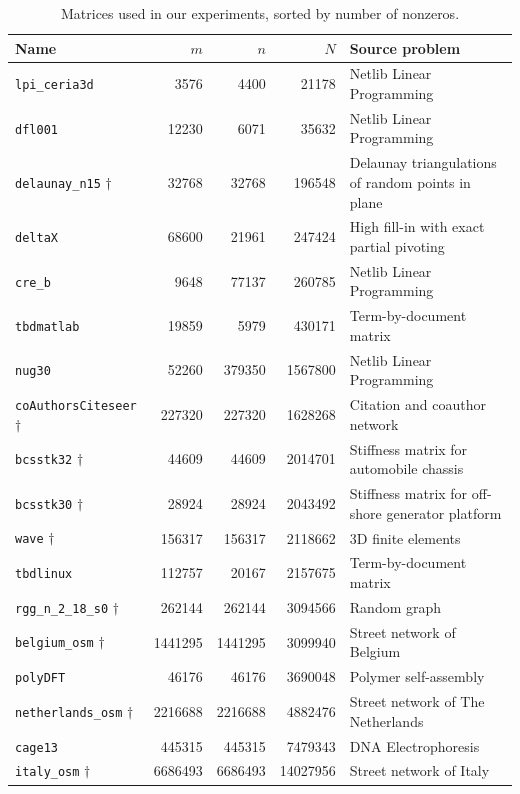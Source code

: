 \begin{table}[h]
	\centering
	\begin{tabular}{|l|r|r|r|p{7cm} |}
		\hline	
		\textbf{Name} & \textbf{$m$} & \textbf{$n$} & \textbf{$N$} & \textbf{Source problem} \\ \hline
		\verb|lpi_ceria3d| 									& 3576 		& 4400 		& 21178 & Netlib Linear Programming \\
		\verb|dfl001| 											& 12230 	& 6071 		& 35632 & Netlib Linear Programming \\ 
		\verb|delaunay_n15| $\dagger$ 			& 32768 	& 32768 	& 196548 & Delaunay triangulations of random points in plane \\ 
		\verb|deltaX| 											& 68600 	& 21961 	& 247424 & High fill-in with exact partial pivoting \\
		\verb|cre_b| 												& 9648 		& 77137 	& 260785 & Netlib Linear Programming \\ 
		\verb|tbdmatlab| 										& 19859 	& 5979 		& 430171 & Term-by-document matrix \\ 
		\verb|nug30|												& 52260 	& 379350 	& 1567800 & Netlib Linear Programming \\ 
		\verb|coAuthorsCiteseer| $\dagger$ 	& 227320 	& 227320 	& 1628268 & Citation and coauthor network\\ 
		\verb|bcsstk32| $\dagger$ 					& 44609 	& 44609 	& 2014701 & Stiffness matrix for automobile chassis \\ 
		\verb|bcsstk30| $\dagger$						& 28924 	& 28924 	& 2043492 & Stiffness matrix for off-shore generator platform \\
		\verb|wave| 	$\dagger$							& 156317 	& 156317 	& 2118662 & 3D finite elements \\
		\verb|tbdlinux| 										& 112757 	& 20167 	& 2157675 & Term-by-document matrix \\
		\verb|rgg_n_2_18_s0| $\dagger$ 			& 262144 	& 262144 	& 3094566 & Random graph \\
		\verb|belgium_osm| $\dagger$				& 1441295 & 1441295 & 3099940 & Street network of Belgium\\
		\verb|polyDFT| 											& 46176 	& 46176 	& 3690048 & Polymer self-assembly \\ 
		\verb|netherlands_osm| $\dagger$		& 2216688 & 2216688 & 4882476 & Street network of The Netherlands \\
		\verb|cage13| 											& 445315 	& 445315 	& 7479343 & DNA Electrophoresis \\
		\verb|italy_osm| $\dagger$					& 6686493 & 6686493 & 14027956 & Street network of Italy\\
		\hline
	\end{tabular}
	\caption{Matrices used in our experiments, sorted by number of nonzeros.} \label{tab:matrices}
\end{table}

